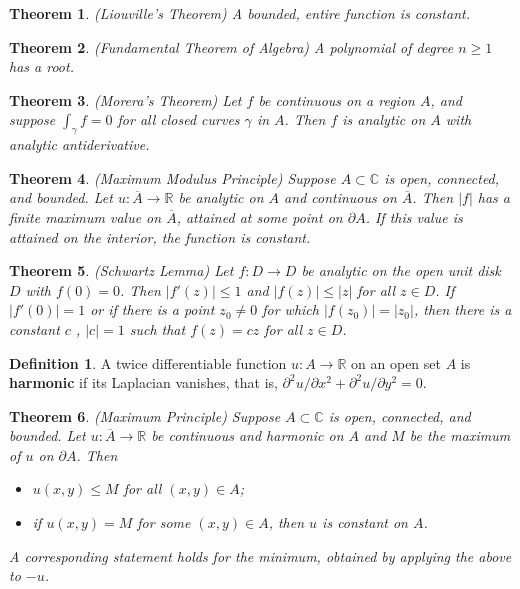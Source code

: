 \documentclass[11pt]{amsart}
\newtheorem*{theorem*}{Theorem}
\theoremstyle{definition}
\newtheorem*{definition*}{Definition}
\renewcommand\geq{\geqslant}
\renewcommand\leq{\leqslant}
\renewcommand\:{\colon}
\renewcommand\bar[1]{\overline{#1}}
\newcommand{\C}{\mathds{C}}
\newcommand{\R}{\mathds{R}}
\begin{document}
\begin{theorem*}
	\textnormal{(Liouville's Theorem)} A bounded, entire function is constant.
\end{theorem*}

\begin{theorem*}
	\textnormal{(Fundamental Theorem of Algebra)} A polynomial of degree $n \geq 1$ has a root.
\end{theorem*}

\begin{theorem*}
	\textnormal{(Morera's Theorem)} Let $f$ be continuous on a region $A$, and suppose $\int_\gamma f = 0$ for all closed curves $\gamma$ in $A$. Then $f$ is analytic on $A$ with analytic antiderivative. 
\end{theorem*}
\vskip40pt



\begin{theorem*}
	\textnormal{(Maximum Modulus Principle)} Suppose $A \subset \C$ is open, connected, and bounded. Let $u\: \bar{A} \to \R$ be analytic on $A$ and continuous on $\bar{A}$. Then $|f|$ has a finite maximum value on $\bar{A}$, attained at some point on $\partial A$. If this value is attained on the interior, the function is constant. 
\end{theorem*}

\begin{theorem*}
	\textnormal{(Schwartz Lemma)} Let $f\: D \to D$ be analytic on the open unit disk $D$ with $f(0) = 0$. Then $|f'(z)| \leq 1$ and $|f(z)| \leq |z|$ for all $z \in D$. If $|f'(0)| = 1$ or if there is a point $z_0 \neq 0$ for which $|f(z_0)| = |z_0|$, then there is a constant $c$ , $|c| = 1$ such that $f(z) = cz$ for all $z \in D$.
\end{theorem*}

\begin{definition*}
	A twice differentiable function $u\: A \to \R$ on an open set $A$ is \textbf{harmonic} if its Laplacian vanishes, that is, $\partial^2 u/\partial x^2 + \partial^2 u/\partial y^2 = 0$.
\end{definition*}

\begin{theorem*}
	\textnormal{(Maximum Principle)} Suppose $A \subset \C$ is open, connected, and bounded. Let $u\: \bar{A} \to \R$ be continuous and harmonic on $A$ and $M$ be the maximum of $u$ on $\partial A$. Then
	\begin{itemize}[leftmargin=22.5pt]\setlength\itemsep{0em}
		\item[\textnormal{(i)}] $u(x, y) \leq M$ for all $(x, y) \in A$;
		\item[\textnormal{(ii)}] if $u(x,y) = M$ for some $(x, y) \in A$, then $u$ is constant on $A$. 
	\end{itemize}
	A corresponding statement holds for the minimum, obtained by applying the above to $-u$.
\end{theorem*}
\vskip40pt
\end{document}

